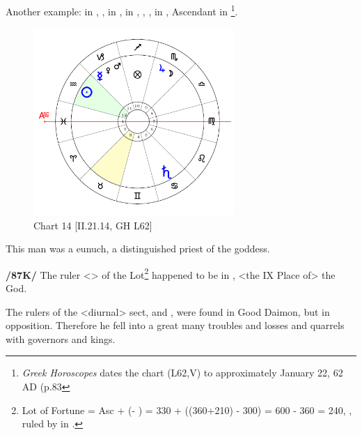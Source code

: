 Another example: \Sun\xspace in \Aquarius, \Moon, \Jupiter\xspace in \Scorpio, \Saturn\xspace in \Cancer, \Mars, \Venus, \Mercury\xspace in \Capricorn, Ascendant in \Pisces
\footnote{\textit{Greek Horoscopes} dates the chart (L62,V) to approximately January 22, 62 AD (p.83}.

\clearpage
\begin{figure}
\centering
\vspace{-20pt}
\includegraphics[width=0.68\textwidth]{charts/2_21_14}
\caption{Chart 14 [II.21.14, GH L62]}
\label{fig:chart14}
\end{figure}

This man was a eunuch, a distinguished priest of the goddess. 

\textbf{/87K/} The ruler <\Jupiter> of the Lot\footnote{Lot of Fortune = Asc + (\Moon\xspace\xspace - \Sun) = 330 + ((360+210) - 300) = 600 - 360 = 240, \Sagittarius, ruled by \Jupiter\xspace in \Scorpio.}
 happened to be in \Scorpio, <the IX Place of> the God. 
 
 The rulers of the <diurnal> sect, \Saturn\xspace and \Mercury, were found in Good Daimon, but in opposition. Therefore he fell into a great many troubles and losses and quarrels with governors and kings.

\newpage